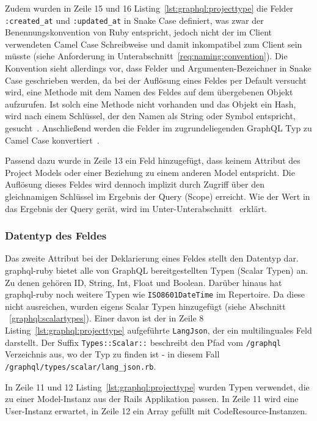 Zudem wurden in Zeile 15 und 16 Listing~\ref{lst:graphql:projecttype} die Felder \texttt{:created\_at} und \texttt{:updated\_at} in Snake Case definiert, was zwar der Benennungskonvention von Ruby entspricht, jedoch nicht der im Client verwendeten Camel Case Schreibweise und damit inkompatibel zum Client sein müsste (siehe Anforderung in Unterabschnitt~\ref{req:naming:convention}). Die Konvention sieht allerdings vor, dass Felder und Argumenten-Bezeichner in Snake Case geschrieben werden, da bei der Auflösung eines Feldes per Default versucht wird, eine Methode mit dem Namen des Feldes auf dem übergebenen Objekt aufzurufen.
Ist solch eine Methode nicht vorhanden und das Objekt ein Hash, wird nach einem Schlüssel, der den Namen als String oder Symbol entspricht, gesucht~\cite{graphql-field-resolution}. Anschließend werden die Felder im zugrundeliegenden GraphQL Typ zu Camel Case konvertiert~\cite{graphql-object-classes}.

Passend dazu wurde in Zeile 13 ein Feld hinzugefügt, dass keinem Attribut des Project Models oder einer Beziehung zu einem anderen Model entspricht. Die Auflösung dieses Feldes wird dennoch implizit durch Zugriff über den gleichnamigen Schlüssel im Ergebnis der Query (Scope) erreicht. Wie der Wert in das Ergebnis der Query gerät, wird im Unter-Unterabschnitt~ erklärt.

\subsubsection{Datentyp des Feldes}
Das zweite Attribut bei der Deklarierung eines Feldes stellt den Datentyp dar. graphql-ruby bietet alle von GraphQL bereitgestellten Typen (Scalar Typen) an. Zu denen gehören ID, String, Int, Float und Boolean. Darüber hinaus hat graphql-ruby noch weitere Typen wie \texttt{ISO8601DateTime} im Repertoire. Da diese nicht ausreichen, wurden eigens Scalar Typen hinzugefügt (siehe Abschnitt ~\ref{graphql:scalartypes}). Einer davon ist der in Zeile 8 Listing~\ref{lst:graphql:projecttype} aufgeführte \texttt{LangJson}, der ein multilinguales Feld darstellt. Der Suffix \texttt{Types::Scalar::} beschreibt den Pfad vom \texttt{/graphql} Verzeichnis aus, wo der Typ zu finden ist - in diesem Fall \lstinline|/graphql/types/scalar/lang_json.rb|.

In Zeile 11 und 12 Listing~\ref{lst:graphql:projecttype} wurden Typen verwendet, die zu einer Model-Instanz aus der Rails Applikation passen. In Zeile 11 wird eine User-Instanz erwartet, in Zeile 12 ein Array gefüllt mit CodeResource-Instanzen.

